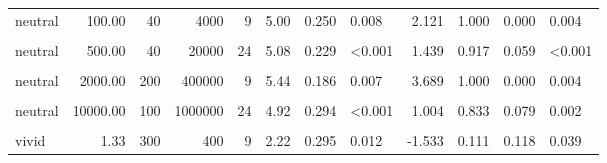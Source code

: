 \documentclass[
]{article}
\begin{document}
\begin{longtable}[t]{lrrrrrrlrrrl}
\hspace{1em}neutral & 100.00 & 40 & 4000 & 9 & 5.00 & 0.250 & 0.008 & 2.121 & 1.000 & 0.000 & 0.004\\
\hspace{1em}\cellcolor{gray!10}{neutral} & \cellcolor{gray!10}{500.00} & \cellcolor{gray!10}{10} & \cellcolor{gray!10}{5000} & \cellcolor{gray!10}{9} & \cellcolor{gray!10}{5.22} & \cellcolor{gray!10}{0.344} & \cellcolor{gray!10}{0.011} & \cellcolor{gray!10}{1.772} & \cellcolor{gray!10}{0.889} & \cellcolor{gray!10}{0.118} & \cellcolor{gray!10}{0.039}\\
\hspace{1em}neutral & 500.00 & 40 & 20000 & 24 & 5.08 & 0.229 & <0.001 & 1.439 & 0.917 & 0.059 & <0.001\\
\hspace{1em}\cellcolor{gray!10}{neutral} & \cellcolor{gray!10}{2000.00} & \cellcolor{gray!10}{20} & \cellcolor{gray!10}{40000} & \cellcolor{gray!10}{24} & \cellcolor{gray!10}{4.96} & \cellcolor{gray!10}{0.292} & \cellcolor{gray!10}{<0.001} & \cellcolor{gray!10}{1.043} & \cellcolor{gray!10}{0.833} & \cellcolor{gray!10}{0.079} & \cellcolor{gray!10}{0.002}\\
\hspace{1em}neutral & 2000.00 & 200 & 400000 & 9 & 5.44 & 0.186 & 0.007 & 3.689 & 1.000 & 0.000 & 0.004\\
\hspace{1em}\cellcolor{gray!10}{neutral} & \cellcolor{gray!10}{10000.00} & \cellcolor{gray!10}{30} & \cellcolor{gray!10}{300000} & \cellcolor{gray!10}{9} & \cellcolor{gray!10}{5.33} & \cellcolor{gray!10}{0.306} & \cellcolor{gray!10}{0.008} & \cellcolor{gray!10}{2.117} & \cellcolor{gray!10}{1.000} & \cellcolor{gray!10}{0.000} & \cellcolor{gray!10}{0.004}\\
\hspace{1em}neutral & 10000.00 & 100 & 1000000 & 24 & 4.92 & 0.294 & <0.001 & 1.004 & 0.833 & 0.079 & 0.002\\
\hspace{1em}\cellcolor{gray!10}{vivid} & \cellcolor{gray!10}{1.33} & \cellcolor{gray!10}{30} & \cellcolor{gray!10}{40} & \cellcolor{gray!10}{24} & \cellcolor{gray!10}{2.33} & \cellcolor{gray!10}{0.280} & \cellcolor{gray!10}{0.001} & \cellcolor{gray!10}{-0.870} & \cellcolor{gray!10}{0.167} & \cellcolor{gray!10}{0.079} & \cellcolor{gray!10}{0.002}\\
\hspace{1em}vivid & 1.33 & 300 & 400 & 9 & 2.22 & 0.295 & 0.012 & -1.533 & 0.111 & 0.118 & 0.039\\

\end{longtable}
\end{document}
